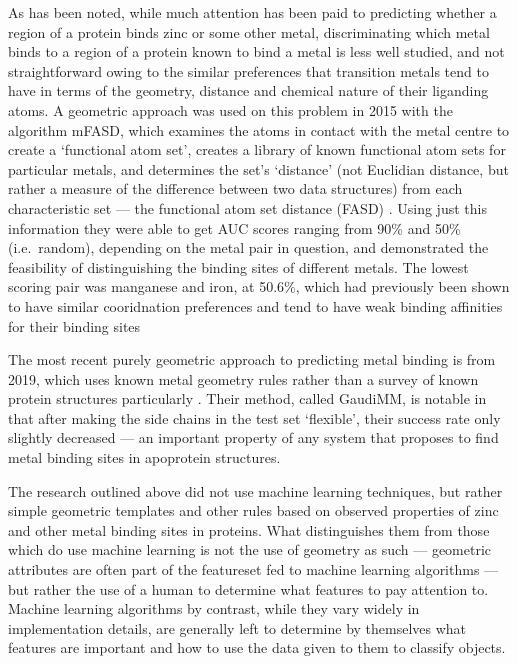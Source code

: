 As has been noted, while much attention has been paid to predicting whether a region of a protein binds zinc or some other metal, discriminating which metal binds to a region of a protein known to bind a metal is less well studied, and not straightforward owing to the similar preferences that transition metals tend to have in terms of the geometry, distance and chemical nature of their liganding atoms. A geometric approach was used on this problem in 2015 with the algorithm mFASD, which examines the atoms in contact with the metal centre to create a `functional atom set', creates a library of known functional atom sets for particular metals, and determines the set's `distance' (not Euclidian distance, but rather a measure of the difference between two data structures) from each characteristic set --- the functional atom set distance (FASD) \cite{he2015}. Using just this information they were able to get AUC scores ranging from 90\% and 50\% (i.e.\ random), depending on the metal pair in question, and demonstrated the feasibility of distinguishing the binding sites of different metals. The lowest scoring pair was manganese and iron, at 50.6\%, which had previously been shown to have similar cooridnation preferences and tend to have weak binding affinities for their binding sites \cite{cotruvo2012mis}

The most recent purely geometric approach to predicting metal binding is from 2019, which uses known metal geometry rules rather than a survey of known protein structures particularly \cite{sciortino2019}. Their method, called GaudiMM, is notable in that after making the side chains in the test set `flexible', their success rate only slightly decreased --- an important property of any system that proposes to find metal binding sites in apoprotein structures.

The research outlined above did not use machine learning techniques, but rather simple geometric templates and other rules based on observed properties of zinc and other metal binding sites in proteins. What distinguishes them from those which do use machine learning is not the use of geometry as such --- geometric attributes are often part of the featureset fed to machine learning algorithms --- but rather the use of a human to determine what features to pay attention to. Machine learning algorithms by contrast, while they vary widely in implementation details, are generally left to determine by themselves what features are important and how to use the data given to them to classify objects.

